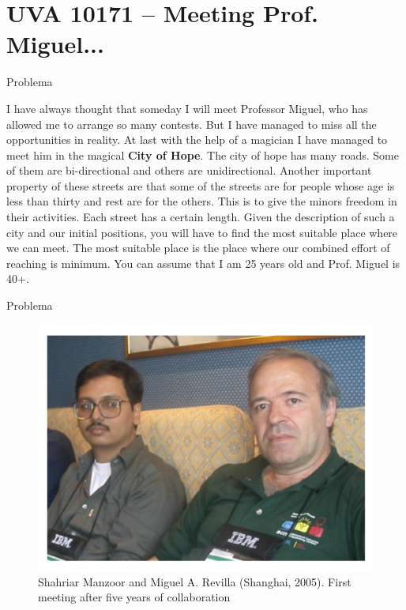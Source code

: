 \section{UVA 10171 -- Meeting Prof. Miguel...}

\begin{frame}[fragile]{Problema}

I have always thought that someday I will meet Professor Miguel,
who has allowed me to arrange so many contests. But I have
managed to miss all the opportunities in reality. At last with the
help of a magician I have managed to meet him in the magical
\textbf{City of Hope}. The city of hope has many roads. Some of
them are bi-directional and others are unidirectional. Another
important property of these streets are that some of the streets
are for people whose age is less than thirty and rest are for the
others. This is to give the minors freedom in their activities.
Each street has a certain length. Given the description of such
a city and our initial positions, you will have to find the most
suitable place where we can meet. The most suitable place is the
place where our combined effort of reaching is minimum. You can
assume that I am 25 years old and Prof. Miguel is 40+.

\end{frame}

\begin{frame}[fragile]{Problema}

\begin{figure}
    \includegraphics[scale=1.2]{figure.png}
    \caption{Shahriar Manzoor and Miguel A.  Revilla (Shanghai, 2005).  First meeting after five years of collaboration}
\end{figure}

\end{frame}

